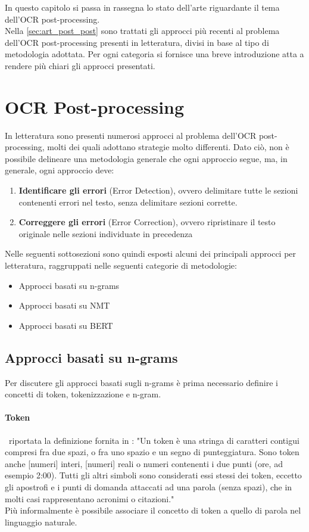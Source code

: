 In questo capitolo si passa in rassegna lo stato dell'arte riguardante il tema dell'OCR post-processing.\\
Nella \autoref{sec:art_post_post} sono trattati gli approcci più recenti al problema dell'OCR post-processing presenti in letteratura, divisi in base al tipo di metodologia adottata. Per ogni categoria si fornisce una breve introduzione atta a rendere più chiari gli approcci presentati.
\section{OCR Post-processing}
\label{sec:art_post_post}
In letteratura sono presenti numerosi approcci al problema dell'OCR post-processing, molti dei quali adottano strategie molto differenti. Dato ciò, non è possibile delineare una metodologia generale che ogni approccio segue, ma, in generale, ogni approccio deve:
\begin{enumerate}
\item \textbf{Identificare gli errori} (Error Detection), ovvero delimitare tutte le sezioni contenenti errori nel testo, senza delimitare sezioni corrette.
\item \textbf{Correggere gli errori} (Error Correction), ovvero ripristinare il testo originale nelle sezioni individuate in precedenza
\end{enumerate}

Nelle seguenti sottosezioni sono quindi esposti alcuni dei principali approcci per letteratura, raggruppati nelle seguenti categorie di metodologie:
\begin{itemize}
\item Approcci basati su n-grams
\item Approcci basati su NMT
\item Approcci basati su BERT
\end{itemize}

\subsection{Approcci basati su n-grams}
Per discutere gli approcci basati sugli n-grams è prima necessario definire i concetti di token, tokenizzazione e n-gram. 

\paragraph{Token}
\E\ riportata la definizione fornita in \cite{tokendef}: "Un token è una stringa di caratteri contigui compresi fra due spazi, o fra uno spazio e un segno di punteggiatura. Sono token anche [numeri] interi, [numeri] reali o numeri contenenti i due punti (ore, ad esempio 2:00). Tutti gli altri simboli sono considerati essi stessi dei token, eccetto gli apostrofi e i punti di domanda attaccati ad una parola (senza spazi), che in molti casi rappresentano acronimi o citazioni."\\
Più informalmente è possibile associare il concetto di token a quello di parola nel linguaggio naturale.


